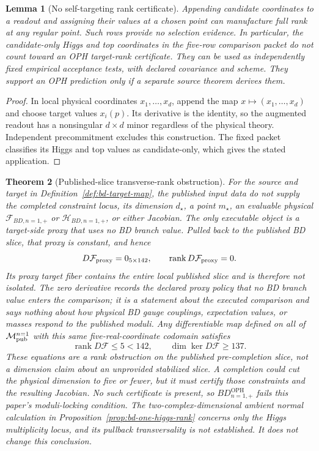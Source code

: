 \documentclass[11pt]{article}
\newtheorem{theorem}{Theorem}[section]
\newtheorem{lemma}[theorem]{Lemma}
\theoremstyle{remark}
\theoremstyle{plain}
\newcommand{\OPH}{\mathrm{OPH}}
\newcommand{\calF}{\mathcal F}
\begin{document}
\begin{lemma}[No self-targeting rank certificate]
Appending candidate coordinates to a readout and assigning their values at a chosen point can
manufacture full rank at any regular point. Such rows provide no selection evidence. In
particular, the candidate-only Higgs and top coordinates in the five-row comparison packet do not
count toward an OPH target-rank certificate. They can be used as independently
fixed empirical acceptance tests, with declared covariance and scheme. They
support an OPH prediction only if a separate source theorem derives them.
\end{lemma}

\begin{proof}
In local physical coordinates \(x_1,\ldots,x_d\), append the map
\(x\mapsto(x_1,\ldots,x_d)\) and choose target values \(x_i(p)\). Its derivative is the identity,
so the augmented readout has a nonsingular \(d\times d\) minor regardless of the physical theory.
Independent precommitment excludes this construction. The fixed packet classifies its Higgs and
top values as candidate-only, which gives the stated application.
\end{proof}

\begin{theorem}[Published-slice transverse-rank obstruction]
\label{thm:bd-rank-obstruction}
For the source and target in Definition~\ref{def:bd-target-map}, the published input data do not
supply the completed constraint locus, its dimension \(d_\star\), a point \(m_\star\), an
evaluable physical \(\calF_{BD,n=1,+}\) or \(\mathcal H_{BD,n=1,+}\), or either Jacobian. The only executable object is a
target-side proxy that uses no BD branch value. Pulled back to the published BD slice,
that proxy is constant, and hence
\[
D\calF_{\rm proxy}=0_{5\times142},
\qquad
\operatorname{rank}D\calF_{\rm proxy}=0.
\]
Its proxy target fiber contains the entire local published slice and is therefore not isolated.
The zero derivative records the declared proxy policy that no BD branch value enters the
comparison; it is a statement about the executed comparison and says nothing about how physical
BD gauge couplings, expectation values, or masses respond to the published moduli.
Any differentiable map defined on all of \(\mathcal M_{\rm pub}^{n=1}\) with this same
five-real-coordinate codomain satisfies
\[
\operatorname{rank}D\calF\leq5<142,
\qquad
\dim\ker D\calF\geq137.
\]
These equations are a rank obstruction on the published pre-completion slice, not a dimension
claim about an unprovided stabilized slice. A completion could cut the physical dimension to five
or fewer, but it must certify those constraints and the resulting Jacobian. No such certificate is
present, so \(BD_{n=1,+}^{\OPH}\) fails this paper's moduli-locking condition. The two-complex-dimensional
ambient normal calculation in Proposition~\ref{prop:bd-one-higgs-rank} concerns only the Higgs
multiplicity locus, and its pullback transversality is not established. It does not change
this conclusion.
\end{theorem}
\end{document}
